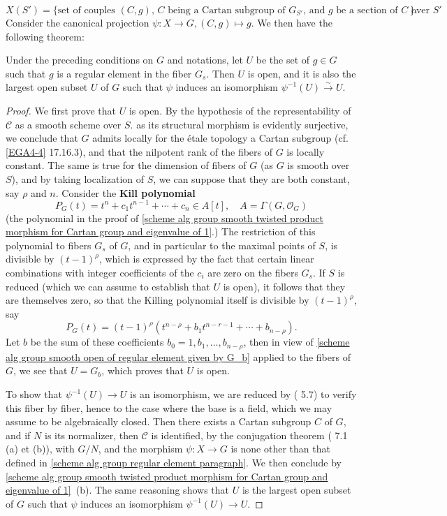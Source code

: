 \[X(S')=\{\text{set of couples $(C,g)$, $C$ being a Cartan subgroup of $G_{S'}$, and $g$ be a section of $C$ over $S'$}\}.\]
Consider the canonical projection $\psi:X\to G,(C,g)\mapsto g$. We then have the following theorem:

\begin{theorem}\label{scheme group regular set twisted product morphism birational}
Under the preceding conditions on $G$ and notations, let $U$ be the set of $g\in G$ such that $g$ is a regular element in the fiber $G_s$. Then $U$ is open, and it is also the largest open subset $U$ of $G$ such that $\psi$ induces an isomorphism $\psi^{-1}(U)\stackrel{\sim}{\to} U$.
\end{theorem}
\begin{proof}
We first prove that $U$ is open. By the hypothesis of the representability of $\mathscr{C}$ as a smooth scheme over $S$. as its structural morphism is evidently surjective, we conclude that $G$ admits locally for the \'etale topology a Cartan subgroup (cf. \cref{EGA4-4} 17.16.3), and that the nilpotent rank of the fibers of $G$ is locally constant. The same is true for the dimension of fibers of $G$ (as $G$ is smooth over $S$), and by taking localization of $S$, we can suppose that they are both constant, say $\rho$ and $n$. Consider the \textbf{Kill polynomial}
\[P_G(t)=t^n+c_1t^{n-1}+\cdots+c_n\in A[t],\quad A=\Gamma(G,\mathscr{O}_G)\]
(the polynomial in the proof of \cref{scheme alg group smooth twisted product morphism for Cartan group and eigenvalue of 1}.) The restriction of this polynomial to fibers $G_s$ of $G$, and in particular to the maximal points of $S$, is divisible by $(t-1)^\rho$, which is expressed by the fact that certain linear combinations with integer coefficients of the $c_i$ are zero on the fibers $G_s$. If $S$ is reduced (which we can assume to establish that $U$ is open), it follows that they are themselves zero, so that the Killing polynomial itself is divisible by $(t-1)^\rho$, say
\[P_G(t)=(t-1)^\rho(t^{n-\rho}+b_1t^{n-r-1}+\cdots+b_{n-\rho}).\]
Let $b$ be the sum of these coefficients $b_0=1,b_1,\dots,b_{n-\rho}$, then in view of \cref{scheme alg group smooth open of regular element given by G_b} applied to the fibers of $G$, we see that $U=G_b$, which proves that $U$ is open.\par
To show that $\psi^{-1}(U)\to U$ is an isomorphism, we are reduced by (\cite{SGA1}  5.7) to verify this fiber by fiber, hence to the case where the base is a field, which we may assume to be algebraically closed. Then there exists a Cartan subgroup $C$ of $G$, and if $N$ is its normalizer, then $\mathscr{C}$ is identified, by the conjugation theorem (\cite{SGA3-2}  7.1 (a) et (b)), with $G/N$, and the morphism $\psi:X\to G$ is none other than that defined in \ref{scheme alg group regular element paragraph}. We then conclude by \cref{scheme alg group smooth twisted product morphism for Cartan group and eigenvalue of 1}~(b). The same reasoning shows that $U$ is the largest open subset of $G$ such that $\psi$ induces an isomorphism $\psi^{-1}(U)\to U$.
\end{proof}


